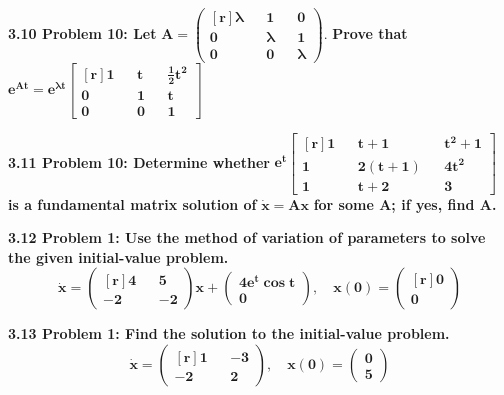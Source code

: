 \documentclass[12pt]{article}
\renewcommand{\l}{\lambda}
\begin{document}
\textbf{3.10 Problem 10: Let}
\(\mathbf{A = \begin{pmatrix*}[r]
  \l && 1 && 0 \\ 0 && \l && 1 \\ 0 && 0 && \l 
\end{pmatrix*}.}\)
\textbf{Prove that}
\(\mathbf{e^{At} = e^{\l t}\begin{bmatrix*}[r]
  1 && t && \frac{1}{2}t^2 \\ 0 && 1 && t \\ 0 && 0 && 1
\end{bmatrix*}}\)
\newpage

\textbf{3.11 Problem 10: Determine whether} 
\(\mathbf{e^t \begin{bmatrix*}[r]
  1 && t+1 && t^2+1 \\ 1 && 2(t+1) && 4t^2 \\ 1 && t+2 && 3
\end{bmatrix*}}\)
\textbf{is a fundamental matrix solution of}
\(\mathbf{\dot x = Ax}\)
\textbf{for some A; if yes, find A.}
\newpage 

\textbf{3.12 Problem 1: Use the method of variation of parameters to solve 
the given initial-value problem.}
\[\mathbf{\dot x = \begin{pmatrix*}[r] 4 && 5 \\ -2 && -2 \end{pmatrix*}x + 
  \begin{pmatrix*} 4e^t \cos t \\ 0 \end{pmatrix*}, \quad
  x(0) = \begin{pmatrix*}[r] 0 \\ 0 \end{pmatrix*}
}\]
\newpage 

\textbf{3.13 Problem 1: Find the solution to the initial-value problem.}
\[\mathbf{\dot x = \begin{pmatrix*}[r] 1 && -3 \\ -2 && 2 \end{pmatrix*}, \quad
  x(0) = \begin{pmatrix*} 0 \\ 5 \end{pmatrix*}}\]
\end{document}
